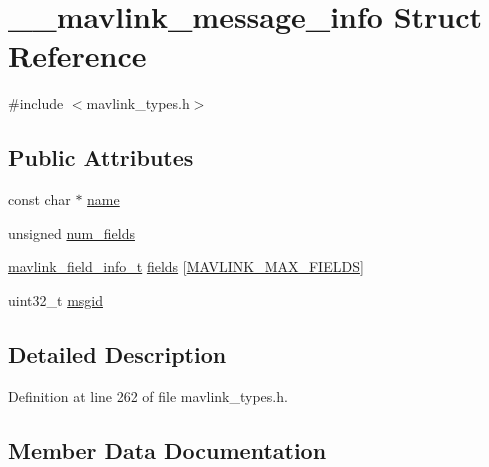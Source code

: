 \hypertarget{struct____mavlink__message__info}{}\section{\+\_\+\+\_\+mavlink\+\_\+message\+\_\+info Struct Reference}
\label{struct____mavlink__message__info}


{\ttfamily \#include $<$mavlink\+\_\+types.\+h$>$}

\subsection*{Public Attributes}
\begin{DoxyCompactItemize}
\item 
const char $\ast$ \mbox{\hyperlink{struct____mavlink__message__info_a0fcc0c1558ed3da428104ba8ee136505}{name}}
\item 
unsigned \mbox{\hyperlink{struct____mavlink__message__info_a0c343bcc1f27884e8c2ab875e7efc2e5}{num\+\_\+fields}}
\item 
\mbox{\hyperlink{include__v0_89_2mavlink__types_8h_a00291ed73cb08731cbcccb8dc974ac95}{mavlink\+\_\+field\+\_\+info\+\_\+t}} \mbox{\hyperlink{struct____mavlink__message__info_acecb3dbb50734aa10132dfea73f088dd}{fields}} \mbox{[}\mbox{\hyperlink{include__v2_80_2mavlink__types_8h_a27984b8945d505a56168731dc3cac63a}{M\+A\+V\+L\+I\+N\+K\+\_\+\+M\+A\+X\+\_\+\+F\+I\+E\+L\+DS}}\mbox{]}
\item 
uint32\+\_\+t \mbox{\hyperlink{struct____mavlink__message__info_a4d2150d2bb5fdaa7da1231f3515d8cc4}{msgid}}
\end{DoxyCompactItemize}


\subsection{Detailed Description}


Definition at line 262 of file mavlink\+\_\+types.\+h.



\subsection{Member Data Documentation}
\mbox{\label{struct____mavlink__message__info_acecb3dbb50734aa10132dfea73f088dd}} 
